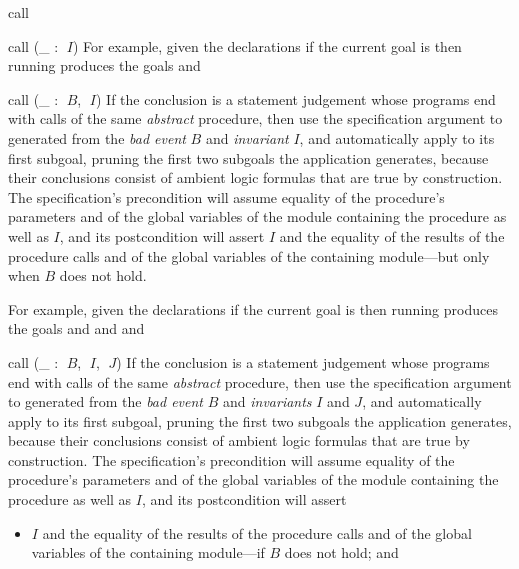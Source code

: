 \begin{tactic}{call}
\begin{tsyntax}{call (_ : $\;I$)}
    \medskip
    For example, given the declarations
    if the current goal is
    then running
    produces the goals
     and
  \end{tsyntax}

  \begin{tsyntax}{call (_ : $\;B$, $\;I$)}
    If the conclusion is a \prhl statement judgement whose programs
    end with calls of the same \emph{abstract} procedure, then use the
    specification argument to  generated from the \emph{bad
      event} $B$ and \emph{invariant} $I$, and automatically apply
     to its first subgoal, pruning the first two
    subgoals the application generates, because their conclusions
    consist of ambient logic formulas that are true by construction.
    The specification's precondition will assume equality of the
    procedure's parameters and of the global variables of the module
    containing the procedure as well as $I$, and its postcondition
    will assert $I$ and the equality of the results of the procedure
    calls and of the global variables of the containing module---but
    only when $B$ does not hold.

    \medskip
    For example, given the declarations
    if the current goal is
    then running
    produces the goals
     and
     and
     and
  \end{tsyntax}

  \begin{tsyntax}{call (_ : $\;B$, $\;I$, $\;J$)}
    If the conclusion is a \prhl statement judgement whose programs
    end with calls of the same \emph{abstract} procedure, then use the
    specification argument to  generated from the \emph{bad
      event} $B$ and \emph{invariants} $I$ and $J$, and automatically
    apply  to its first subgoal, pruning the
    first two subgoals the application generates, because their
    conclusions consist of ambient logic formulas that are true by
    construction.  The specification's precondition will assume
    equality of the procedure's parameters and of the global variables
    of the module containing the procedure as well as $I$, and its
    postcondition will assert
    \begin{itemize}
    \item $I$ and the equality of the results of the procedure calls
      and of the global variables of the containing module---if $B$
      does not hold; and


\end{itemize}
\end{tsyntax}
\end{tactic}

